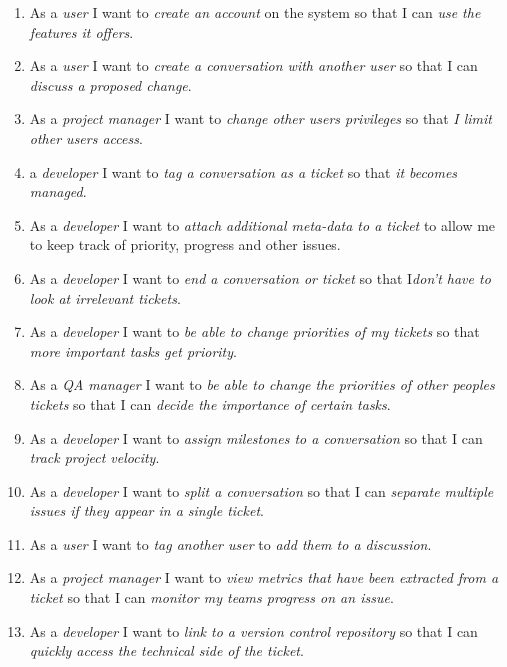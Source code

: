 \documentclass[a4paper]{l3proj}
\begin{document}
\begin{enumerate}[ref=\arabic*]
\item As a \textit{user} I want to \textit{create an account} on the system so that I can \textit{use the features it offers}. \label{item:1}
\item As a \textit{user} I want to \textit{create a conversation with another user} so that I can \textit{discuss a proposed change}. \label{item:2}
\item As a \textit{project manager} I want to \textit{change other users privileges} so that \textit{I limit other users access}. \label{item:3}
\item  a \textit{developer} I want to \textit{tag a conversation as a ticket} so that \textit{it becomes managed}.\label{item:4}
\item As a \textit{developer} I want to \textit{attach additional meta-data to a ticket} to allow me to keep track of priority, progress and other issues.\label{item:5}
\item As a \textit{developer} I want to \textit{end a conversation or ticket} so that I\textit{don't have to look at irrelevant tickets}.\label{item6}
\item As a \textit{developer} I want to \textit{be able to change priorities of my tickets} so that \textit{more important tasks get priority}.\label{item:7}
\item As a \textit{QA manager} I want to \textit{be able to change the priorities of other peoples tickets} so that I can \textit{decide the importance of certain tasks}.\label{item:8}
\item As a \textit{developer} I want to \textit{assign milestones to a conversation} so that I can \textit{track project velocity}.\label{item:9}
\item As a \textit{developer} I want to \textit{split a conversation} so that I can \textit{separate multiple issues if they appear in a single ticket}.\label{item:10}
\item As a \textit{user} I want to \textit{tag another user} to \textit{add them to a discussion}.\label{item:11}
\item As a \textit{project manager} I want to \textit{view metrics that have been extracted from a ticket} so that I can \textit{monitor my teams progress on an issue}.\label{item:12}
\item As a \textit{developer} I want to \textit{link to a version control repository} so that I can \textit{quickly access the technical side of the ticket}.\label{item:13}

\end{enumerate}
\end{document}
